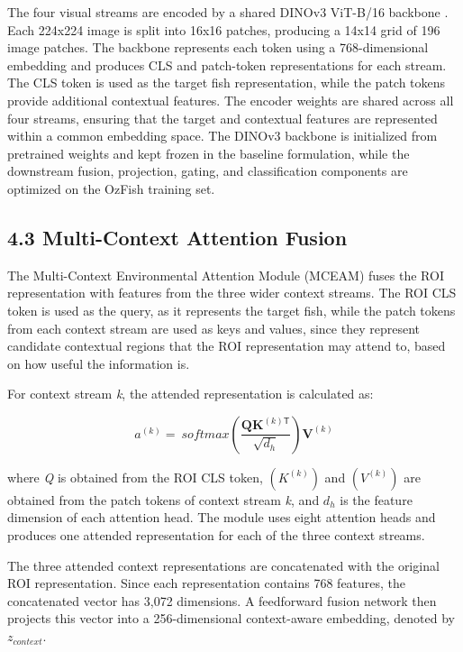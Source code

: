\documentclass[preprint,12pt]{elsarticle}
\begin{document}
The four visual streams are encoded by a shared DINOv3 ViT-B/16 backbone
\cite{ref25}
\cite{ref36}. Each 224x224 image is split into
16x16 patches, producing a 14x14 grid of 196 image patches. The backbone
represents each token using a 768-dimensional embedding and produces CLS
and patch-token representations for each stream. The CLS token is used
as the target fish representation, while the patch tokens provide
additional contextual features. The encoder weights are shared across
all four streams, ensuring that the target and contextual features are
represented within a common embedding space. The DINOv3 backbone is
initialized from pretrained weights \cite{ref25}
and kept frozen in the baseline formulation, while the downstream
fusion, projection, gating, and classification components are optimized
on the OzFish training set.

\subsection*{4.3 Multi-Context Attention
Fusion}\label{multi-context-attention-fusion}

The Multi-Context Environmental Attention Module (MCEAM)
\cite{ref26} fuses the ROI representation with
features from the three wider context streams. The ROI CLS token is used
as the query, as it represents the target fish, while the patch tokens
from each context stream are used as keys and values, since they
represent candidate contextual regions that the ROI representation may
attend to, based on how useful the information is.

For context stream \emph{k}, the attended representation is calculated
as:

\begin{equation}
a^{(k)} = \ softmax\left( \frac{\mathbf{QK}^{(k)\mathsf{T}}}{\sqrt{d_{h}}} \right)\mathbf{V}^{(k)}
\end{equation}

where \emph{Q} is obtained from the ROI CLS token,
\(\left( K^{(k)} \right)\) and \(\left( V^{(k)} \right)\) are obtained
from the patch tokens of context stream \emph{k}, and \(d_{h}\) is the
feature dimension of each attention head. The module uses eight
attention heads and produces one attended representation for each of the
three context streams.

The three attended context representations are concatenated with the
original ROI representation. Since each representation contains 768
features, the concatenated vector has 3,072 dimensions. A feedforward
fusion network then projects this vector into a 256-dimensional
context-aware embedding, denoted by \(z_{context}.\)
\end{document}
